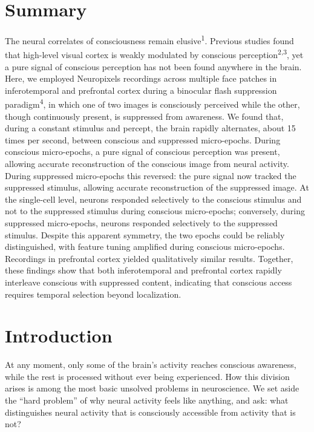 \documentclass{article}
\begin{document}
\section*{Summary}

The neural correlates of consciousness remain elusive\textsuperscript{1}. Previous studies found that high-level visual cortex is weakly modulated by conscious perception\textsuperscript{2,3}, yet a pure signal of conscious perception has not been found anywhere in the brain. Here, we employed Neuropixels recordings across multiple face patches in inferotemporal and prefrontal cortex during a binocular flash suppression paradigm\textsuperscript{4}, in which one of two images is consciously perceived while the other, though continuously present, is suppressed from awareness. We found that, during a constant stimulus and percept, the brain rapidly alternates, about 15 times per second, between conscious and suppressed micro-epochs. During conscious micro-epochs, a pure signal of conscious perception was present, allowing accurate reconstruction of the conscious image from neural activity. During suppressed micro-epochs this reversed: the pure signal now tracked the suppressed stimulus, allowing accurate reconstruction of the suppressed image. At the single-cell level, neurons responded selectively to the conscious stimulus and not to the suppressed stimulus during conscious micro-epochs; conversely, during suppressed micro-epochs, neurons responded selectively to the suppressed stimulus. Despite this apparent symmetry, the two epochs could be reliably distinguished, with feature tuning amplified during conscious micro-epochs. Recordings in prefrontal cortex yielded qualitatively similar results. Together, these findings show that both inferotemporal and prefrontal cortex rapidly interleave conscious with suppressed content, indicating that conscious access requires temporal selection beyond localization.

\section*{Introduction}

At any moment, only some of the brain's activity reaches conscious awareness, while the rest is processed without ever being experienced. How this division arises is among the most basic unsolved problems in neuroscience. We set aside the ``hard problem'' of why neural activity feels like anything, and ask: what distinguishes neural activity that is consciously accessible from activity that is not?
\end{document}

